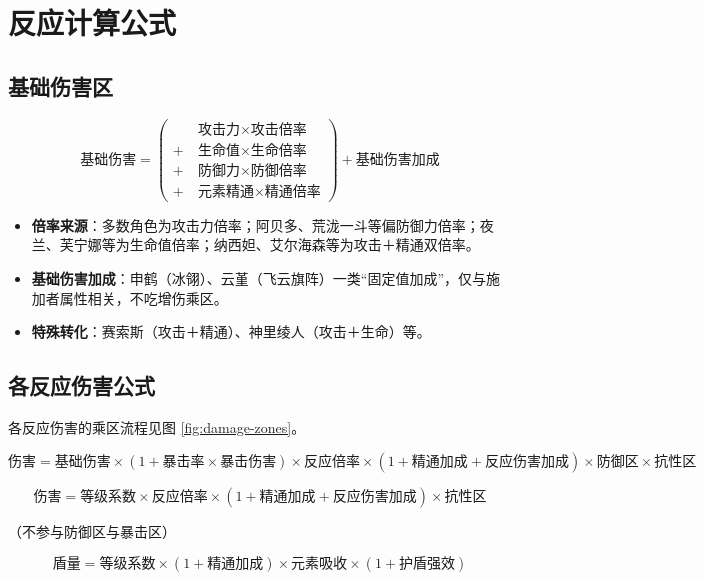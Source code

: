 \section{反应计算公式}

\subsection{基础伤害区}

\[
\text{基础伤害} = \left( \begin{aligned}
&\text{攻击力} \times \text{攻击倍率} \\
+\ &\text{生命值} \times \text{生命倍率} \\
+\ &\text{防御力} \times \text{防御倍率} \\
+\ &\text{元素精通} \times \text{精通倍率}
\end{aligned} \right) + \text{基础伤害加成}
\]

\begin{itemize}
  \item \textbf{倍率来源}：多数角色为攻击力倍率；阿贝多、荒泷一斗等偏防御力倍率；夜兰、芙宁娜等为生命值倍率；纳西妲、艾尔海森等为攻击＋精通双倍率。
  \item \textbf{基础伤害加成}：申鹤（冰翎）、云堇（飞云旗阵）一类“固定值加成”，仅与施加者属性相关，不吃增伤乘区。
  \item \textbf{特殊转化}：赛索斯（攻击＋精通）、神里绫人（攻击＋生命）等。
\end{itemize}

\subsection{各反应伤害公式}

各反应伤害的乘区流程见图 \ref{fig:damage-zones}。


\[
\text{伤害} = \text{基础伤害} \times (1 + \text{暴击率} \times \text{暴击伤害})
\times \text{反应倍率} \times (1 + \text{精通加成} + \text{反应伤害加成})
\times \text{防御区} \times \text{抗性区}
\]


\[
\text{伤害} = \text{等级系数} \times \text{反应倍率}
\times (1 + \text{精通加成} + \text{反应伤害加成}) \times \text{抗性区}
\]

（不参与防御区与暴击区）


\[
\text{盾量} = \text{等级系数} \times (1 + \text{精通加成}) \times \text{元素吸收} \times (1 + \text{护盾强效})
\]

